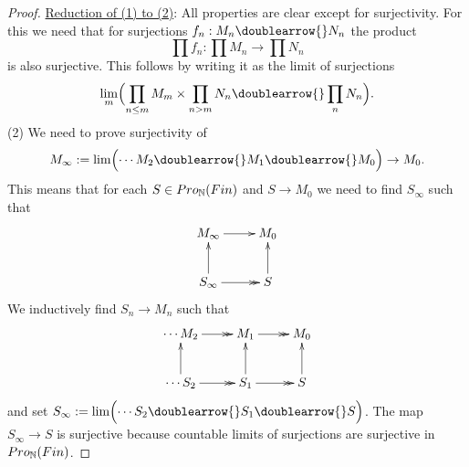 \documentclass{notes}
\begin{document}
\begin{proof}
\ul{Reduction of (1) to (2)}: 
All properties are clear except for surjectivity. For this we need
that for surjections $f_n:M_n\doublearrow{}N_n$ the product
$$
  \prod f_n:\prod M_n\to \prod N_n
$$
is also surjective. This follows by writing it as the limit of surjections
$$
  \lim_m\Bigl(\prod_{n\leq m}M_m\times\prod_{n>m}N_n\doublearrow{}\prod_nN_n\Bigr).
$$
(2) We need to prove surjectivity of
$$
  M_\infty := \lim\Bigl(\cdots
  M_2\doublearrow{}M_1\doublearrow{}M_0\Bigr)\to M_0. 
$$
This means that for each $S\in Pro_{\mathbb{N}}(Fin)$ and $S\to M_0$ we need to find $S_\infty$
such that 
$$
\xymatrix{
  M_\infty \ar[r] & M_0 \\
  S_\infty \ar[u] \ar@{->>}[r] & S \ar[u].
}
$$
We inductively find $S_n\to M_n$ such that
$$
\xymatrix{
  \cdots M_2 \ar@{->>}[r] & M_1 \ar@{->>}[r] & M_0 \\
  \cdots S_2 \ar[u] \ar@{->>}[r] & S_1 \ar[u] \ar@{->>}[r] & S \ar[u]
}
$$
and set $S_\infty := \lim\Bigl(\cdots S_2\doublearrow{}S_1\doublearrow{}S\Bigr)$.
The map $S_\infty\to S$ is surjective because countable limits of
surjections are surjective in $Pro_{\mathbb{N}}(Fin)$. 


\end{proof}
\end{document}
